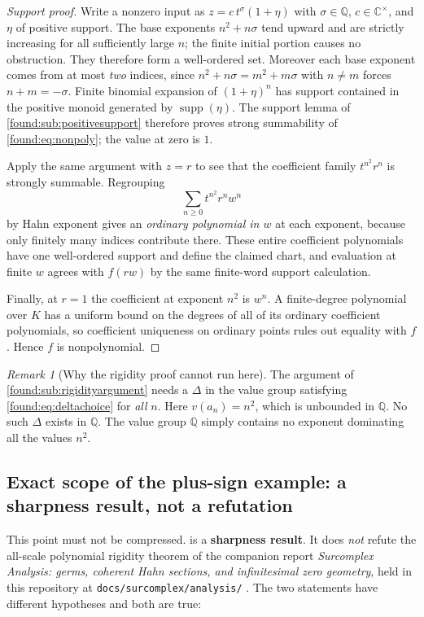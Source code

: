 \documentclass[11pt,letterpaper]{article}
\numberwithin{equation}{section}
\theoremstyle{definition}
\theoremstyle{remark}
\newtheorem{remark}[theorem]{Remark}
\newcommand{\C}{\mathbb C}
\newcommand{\Q}{\mathbb Q}
\newcommand{\supp}{\operatorname{supp}}
\begin{document}
\begin{proof}[Support proof]
Write a nonzero input as $z=c\,t^\sigma(1+\eta)$ with $\sigma\in\Q$,
$c\in\C^\times$, and $\eta$ of positive support. The base exponents
$n^2+n\sigma$ tend upward and are strictly increasing for all sufficiently large
$n$; the finite initial portion causes no obstruction. They therefore form a
well-ordered set. Moreover each base exponent comes from at most \emph{two}
indices, since $n^2+n\sigma=m^2+m\sigma$ with $n\ne m$ forces $n+m=-\sigma$.
Finite binomial expansion of $(1+\eta)^n$ has support contained in the positive
monoid generated by $\supp(\eta)$. The support lemma of
\cref{found:sub:positivesupport} therefore proves strong summability of
\eqref{found:eq:nonpoly}; the value at zero is $1$.

Apply the same argument with $z=r$ to see that the coefficient family
$t^{n^2}r^n$ is strongly summable. Regrouping
\[
 \sum_{n\ge0}t^{n^2}r^nw^n
\]
by Hahn exponent gives an \emph{ordinary polynomial in $w$} at each exponent,
because only finitely many indices contribute there. These entire coefficient
polynomials have one well-ordered support and define the claimed chart, and
evaluation at finite $w$ agrees with $f(rw)$ by the same finite-word support
calculation.

Finally, at $r=1$ the coefficient at exponent $n^2$ is $w^n$. A finite-degree
polynomial over $K$ has a uniform bound on the degrees of all of its ordinary
coefficient polynomials, so coefficient uniqueness on ordinary points rules out
equality with $f$. Hence $f$ is nonpolynomial.
\end{proof}

\begin{remark}[Why the rigidity proof cannot run here]\label{found:rem:whynotransfer}
The argument of \cref{found:sub:rigidityargument} needs a $\Delta$ in the value
group satisfying \eqref{found:eq:deltachoice} for \emph{all} $n$. Here
$v(a_n)=n^2$, which is unbounded in $\Q$. No such $\Delta$ exists in $\Q$. The
value group $\Q$ simply contains no exponent dominating all the values $n^2$.
\end{remark}

\subsection{Exact scope of the plus-sign example: a sharpness result, not a
refutation}
\label{found:sub:scope}
This point must not be compressed.  is a
\textbf{sharpness result}. It does \emph{not} refute the all-scale polynomial
rigidity theorem of the companion report \emph{Surcomplex Analysis: germs,
coherent Hahn sections, and infinitesimal zero geometry}, held in this
repository at \texttt{docs/surcomplex/analysis/}
\cite{found:CompanionAnalysis}. The two statements have different hypotheses and
both are true:
\end{document}
